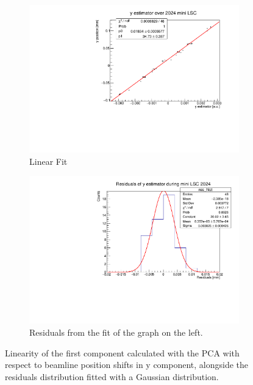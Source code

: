 \begin{figure}
    \centering
    \begin{subfigure}{0.48\textwidth}
    \includegraphics[width=\linewidth]{figures/y_fit_new.pdf}
    \caption{Linear Fit}\label{fig:yfit_data}
    \end{subfigure}
    \begin{subfigure}{0.48\textwidth}
    \includegraphics[width=\linewidth]{figures/y_res_new.pdf}
    \caption{Residuals from the fit of the graph on the left. }\label{fig:yres_data}
    \end{subfigure}
    \caption{Linearity of the first component calculated with the PCA with respect to beamline position shifts in y component, alongside the residuals distribution fitted with a Gaussian distribution.}
    \label{fig:y_MC}
\end{figure}


